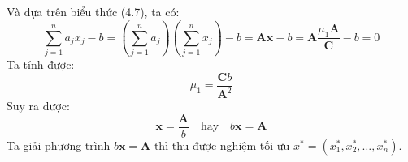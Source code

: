 \begin{solution}
\begin{enumerate}[label=(\alph*)]
\begin{equation}
    \end{equation}
    Và dựa trên biểu thức (4.7), ta có:
    \begin{equation}
        \sum_{j=1}^na_jx_j - b = \left(\sum_{j=1}^na_j\right)\left(\sum_{j=1}^nx_j\right) - b = \mathbf{A}\mathbf{x} - b = \mathbf{A}\dfrac{\mu_1\mathbf{A}}{\mathbf{C}} - b = 0
    \end{equation}
    Ta tính được:
    \begin{equation}
        \mu_1 = \dfrac{\mathbf{C}b}{\mathbf{A}^2}
    \end{equation}
    Suy ra được:
    \begin{equation}
        \mathbf{x} = \dfrac{\mathbf{A}}{b} \quad\text{hay}\quad b\mathbf{x} = \mathbf{A}
    \end{equation}
    Ta giải phương trình $b\mathbf{x} = \mathbf{A}$ thì thu được nghiệm tối ưu $x^{*} = (x^{*}_1, x^{*}_2, \dots, x^{*}_n)$.
    \end{enumerate}
\end{solution}